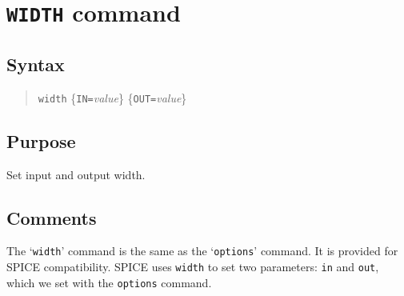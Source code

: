 %
%
%
%
\section{{\tt WIDTH} command}
\subsection{Syntax}
\begin{verse}
{\tt width} \{{\tt IN=}{\it value}\} \{{\tt OUT=}{\it value}\}
\end{verse}
\subsection{Purpose}

Set input and output width.
\subsection{Comments}

The `{\tt width}' command is the same as the `{\tt options}'
command.  It is provided for SPICE compatibility.  SPICE uses
{\tt width} to set two parameters: {\tt in} and {\tt out},
which we set with the {\tt options} command.
